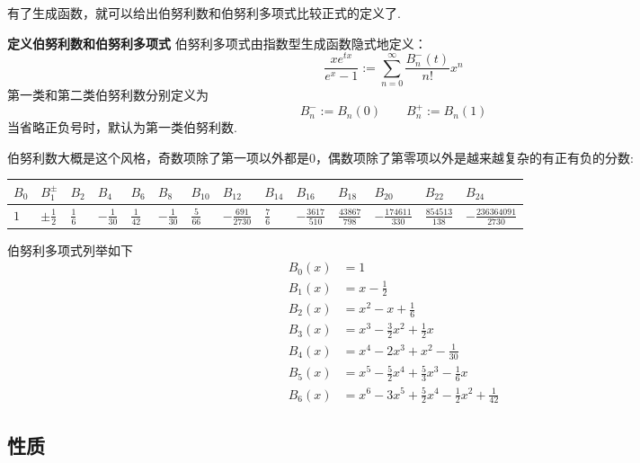 \documentclass[UTF8]{ctexart}
\newenvironment{definition}[1]
    {\begin{tcolorbox}[enhanced, colback=LightYellow, breakable=false, frame hidden, borderline west={1.5mm}{-2mm}{DarkGreen}]
    {\bfseries {\color{DarkGreen} 定义}\quad #1} \newline}
    {\end{tcolorbox}}
\begin{document}
有了生成函数，就可以给出伯努利数和伯努利多项式比较正式的定义了.
\begin{definition}{伯努利数和伯努利多项式}
    伯努利多项式由指数型生成函数隐式地定义：
    \[ \frac{xe^{tx}}{e^{x}-1} := \sum_{n=0}^{\infty}\frac{B_n^-(t)}{n!}x^n \]
    第一类和第二类伯努利数分别定义为
    \[B_n^-:= B_n(0) \qquad B_n^+ := B_n(1)\]
    当省略正负号时，默认为第一类伯努利数.
\end{definition}

伯努利数大概是这个风格，奇数项除了第一项以外都是0，偶数项除了第零项以外是越来越复杂的有正有负的分数:
\newline
\begin{tabular}{|l|l|l|l|l|l|l|l|l|l|l|l|l|l|}
    \hline
    \(B_{0}\) & \(B_{1}^{\pm}\) & \(B_{2}\) & \(B_{4}\) & \(B_{6}\) & \(B_{8}\) & \(B_{10}\) & \(B_{12}\) & \(B_{14}\) & \(B_{16}\) & \(B_{18}\) & \(B_{20}\) & \(B_{22}\)  & \(B_{24}\) \\
    \hline
    \(1\) & \(\pm\frac{1}{2}\) & \(\frac{1}{6}\) & \(-\frac{1}{30}\) & \(\frac{1}{42}\) & \(-\frac{1}{30}\) & \(\frac{5}{66}\) & \(-\frac{691}{2730}\) & \(\frac{7}{6}\) & \(-\frac{3617}{510}\) & \(\frac{43867}{798}\) & \(-\frac{174611}{330}\) & \(\frac{854513}{138}\) & \(-\frac{236364091}{2730}\)\\
    \hline
\end{tabular}
\newline
\vspace{0.5cm}
伯努利多项式列举如下
\begin{align*}
    B_0(x) &= 1 \\
    B_1(x) &= x - \frac{1}{2} \\
    B_2(x) &= x^2 - x + \frac{1}{6} \\
    B_3(x) &= x^3 - \frac{3}{2}x^2 + \frac{1}{2}x  \\
    B_4(x) &= x^4 - 2x^3 + x^2  - \frac{1}{30} \\
    B_5(x) &= x^5 - \frac{5}{2}x^4 + \frac{5}{3}x^3 - \frac{1}{6}x \\
    B_6(x) &= x^6 - 3x^5 + \frac{5}{2}x^4 - \frac{1}{2}x^2 + \frac{1}{42}
\end{align*}

\subsection{性质}
\end{document}
